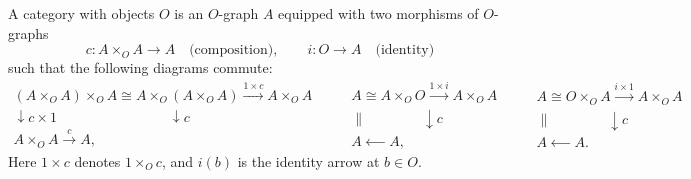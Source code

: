 A category with objects $O$ is an $O$-graph $A$ equipped with two morphisms of $O$-graphs
$$c : A \times_O A \to A \quad \text{(composition)}, \qquad i : O \to A \quad \text{(identity)}$$
such that the following diagrams commute:
\[
\begin{array}{c}
(A \times_O A) \times_O A \cong A \times_O (A \times_O A) \xrightarrow{1 \times c} A \times_O A \\[4pt]
\downarrow \scriptstyle{c \times 1} \qquad\qquad \qquad\qquad \downarrow \scriptstyle{c} \\[4pt]
A \times_O A \xrightarrow{\;c\;} A,
\end{array}
\qquad
\begin{array}{c}
A \cong A \times_O O \xrightarrow{1 \times i} A \times_O A \\[4pt]
\parallel \qquad\qquad \downarrow \scriptstyle{c} \\[4pt]
A \xleftarrow{\qquad} A,
\end{array}
\qquad
\begin{array}{c}
A \cong O \times_O A \xrightarrow{i \times 1} A \times_O A \\[4pt]
\parallel \qquad\qquad \downarrow \scriptstyle{c} \\[4pt]
A \xleftarrow{\qquad} A.
\end{array}
\]
Here $1 \times c$ denotes $1 \times_O c$, and $i(b)$ is the identity arrow at $b \in O$.
